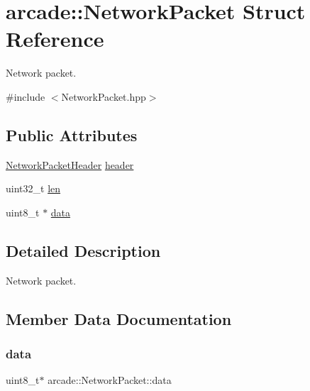 \hypertarget{structarcade_1_1_network_packet}{}\section{arcade\+:\+:Network\+Packet Struct Reference}
\label{structarcade_1_1_network_packet}


Network packet.  




{\ttfamily \#include $<$Network\+Packet.\+hpp$>$}

\subsection*{Public Attributes}
\begin{DoxyCompactItemize}
\item 
\hyperlink{structarcade_1_1_network_packet_header}{Network\+Packet\+Header} \hyperlink{structarcade_1_1_network_packet_ad857cd0a4f6387035f4f954ca6d33676}{header}
\item 
uint32\+\_\+t \hyperlink{structarcade_1_1_network_packet_a1f6c07b81a4e7a276d933f326baae6fa}{len}
\item 
uint8\+\_\+t $\ast$ \hyperlink{structarcade_1_1_network_packet_afb76a6c53bfe65517bd668d4e87d77a3}{data}
\end{DoxyCompactItemize}


\subsection{Detailed Description}
Network packet. 

\subsection{Member Data Documentation}
\mbox{\label{structarcade_1_1_network_packet_afb76a6c53bfe65517bd668d4e87d77a3}} 
\subsubsection{\texorpdfstring{data}{data}}
{\footnotesize\ttfamily uint8\+\_\+t$\ast$ arcade\+::\+Network\+Packet\+::data}

\mbox{\label{structarcade_1_1_network_packet_ad857cd0a4f6387035f4f954ca6d33676}} 
